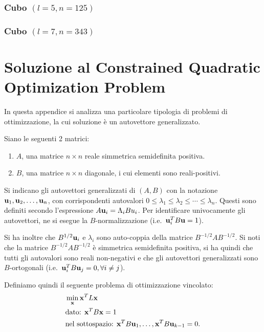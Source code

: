 \documentclass[10pt,a4paper]{article}
\begin{document}
\subsubsection{Cubo \((l = 5, n = 125)\)}

\subsubsection{Cubo \((l = 7, n = 343)\)}

\printbibliography
\appendix
\section{Soluzione al Constrained Quadratic Optimization Problem}\label{sec:soluzione_constrained}
In questa appendice si analizza una particolare tipologia di problemi di ottimizzazione, la cui soluzione è un autovettore generalizzato.

Siano le seguenti 2 matrici:
\begin{enumerate}
    \item \(A\), una matrice \(n \times n\) reale simmetrica semidefinita positiva.
    \item \(B\), una matrice \(n \times n\) diagonale, i cui elementi sono reali-positivi.
\end{enumerate}
Si indicano gli autovettori generalizzati di \((A,B)\) con la notazione \(\vb{u}_1,\vb{u}_2,\ldots,\vb{u}_n\), con corrispondenti autovalori \(0\leq\lambda_1\leq\lambda_2\leq\cdots\leq\lambda_n\).
Questi sono definiti secondo l'espressione \(A \vb{u}_i = \Lambda_i B u_i\).
Per identificare univocamente gli autovettori, ne si esegue la \(B\)-normalizzazione (i.e.\  \(\vb{u}_i^T B \vb{u}=1\)).

Si ha inoltre che \(B^{1/2}\vb{u}_i\) e \(\lambda_i\) sono auto-coppia della matrice \(B^{-1/2} A B^{-1/2}\).
Si noti che la matrice \(B^{-1/2} A B^{-1/2}\) è simmetrica semidefinita positiva, si ha quindi che tutti gli autovalori sono reali non-negativi e che gli autovettori generalizzati sono \(B\)-ortogonali (i.e.\  \(\vb{u}_i^T B \vb{u}_j = 0, \forall i \neq j\)).

Definiamo quindi il seguente problema di ottimizzazione vincolato:
\begin{align}
    & \min_{\vb{x}} \vb{x}^T L\vb{x} \label{eq:definition}\\
    & \text{dato: } \vb{x}^T B\vb{x} = 1 \\
    & \text{nel sottospazio: } \vb{x}^T B \vb{u}_1,\ldots, \vb{x}^T B \vb{u}_{k-1} = 0.
\end{align}
\end{document}
